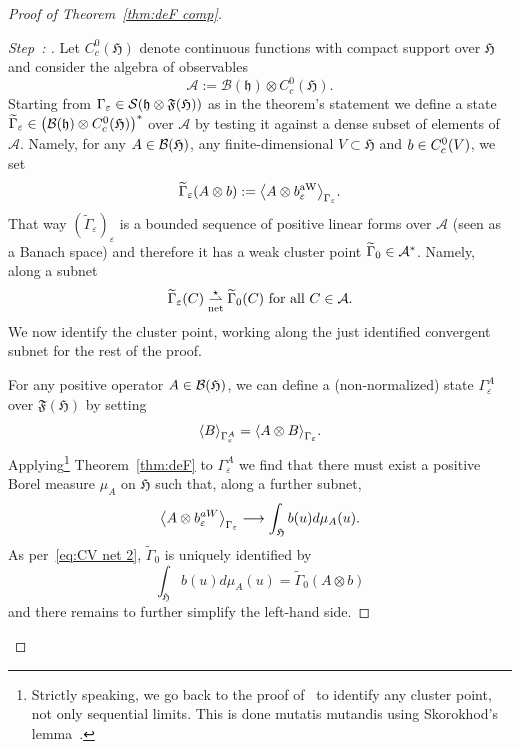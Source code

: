 \documentclass[10pt]{amsart}
\theoremstyle{definition}\newtheorem{defi}[theo]{Definition}\newtheorem{rema}[theo]{Remark}\newtheorem{exam}[theo]{Example}\newtheorem{exem}[theo]{Example}\newtheorem{nota}[theo]{Notation}
\newcommand{\cA}{\mathcal{A}}
\newcommand{\cS}{\mathcal{S}}
\newcommand{\gH}{\mathfrak{H}}
\newcommand{\gF}{\mathfrak{F}}
\newcommand{\gh}{\mathfrak{h}}
\newcommand{\cB}{\mathcal{B}}
\newcommand{\1}{\mathds{1}}
\newcommand{\eps}{\varepsilon}
\newcommand{\Gammat}{\widetilde{\Gamma}}
\newcommand{\cvnet}{\overset{\star}{\underset{\mathrm{net}}{\rightharpoonup}}}
\let\oldin\in
\renewcommand{\in}{\mathchoice{\oldin}{\oldin}{\,\oldin\,}{\,\oldin\,}}
\renewcommand*{\to}{\mathchoice{\longrightarrow}{\rightarrow}{\rightarrow}{\rightarrow}}
\newcounter{setofstep}
\newcounter{step}[setofstep]
\newenvironment{step}[1][]{\refstepcounter{step}\begin{proof}[{Step~\thestep\if#1\empty\else: #1\fi}]}{\let\qed\relax\end{proof}}
\let\originalleft\left
\let\originalright\right
\renewcommand{\left}{\mathopen{}\mathclose\bgroup\originalleft}
\renewcommand{\right}{\aftergroup\egroup\originalright}
\newenvironment{proofc}[1][\proofname]{\begin{proof}[#1]}{\end{proof}}
\begin{document}
\begin{proofc}[Proof of Theorem~\ref{thm:deF comp}]
\begin{step}
Let $C^0_c (\gH)$ denote continuous functions with compact support over $\gH$ and consider the algebra of observables
\begin{equation*}
\cA := \cB (\gh) \otimes C^0_c (\gH).
\end{equation*}
Starting from $\Gamma_\eps \in \cS (\gh \otimes \gF (\gH))$ as in the theorem's statement we define a state $\Gammat_\eps\in \left(\cB (\gh) \otimes C^0_c (\gH) \right)^*$ over $\cA$ by testing it against a dense subset of elements of $\cA$. Namely, for any $A \in \cB(\gH)$, any finite-dimensional $V\subset \gH$ and $b\in C^0_c (V)$, we set
\begin{equation*}
\Gammat_\eps (A \otimes b) := \left\langle A \otimes b^{\rm aW}_{\eps} \right\rangle_{\Gamma_\eps}.
\end{equation*}
That way $(\Gammat_\eps)_\eps$ is a bounded sequence of positive linear forms over $\cA$ (seen as a Banach space) and therefore it has a weak cluster point $\Gammat_0 \in \cA ^*$. Namely, along a subnet
\begin{equation}\label{eq:CV net 2}
\Gammat_\eps (C) \cvnet \Gammat_0 (C) \text{ for all } C \in \cA.
\end{equation}
We now identify the cluster point, working along the just identified convergent subnet for the rest of the proof.

For any positive operator $A\in \cB (\gH)$, we can define a (non-normalized) state $\Gamma ^A _\eps$ over $\gF (\gH)$ by setting
\begin{equation*}
\left\langle B \right\rangle_{\Gamma^A_\eps} = \left\langle A \otimes B\right\rangle_{\Gamma_\eps}.
\end{equation*}
Applying\footnote{Strictly speaking, we go back to the proof of~\cite[Item (i)]{LewNamRou-14d} to identify any cluster point, not only sequential limits. This is done mutatis mutandis using Skorokhod's lemma~\cite{Skorokhod-74}.} Theorem~\ref{thm:deF} to $\Gamma ^A _\eps$ we find that there must exist a positive Borel measure $\mu_A$ on $\gH$ such that, along a further subnet,
\begin{equation}\label{eq:CV net 3}
\left\langle A \otimes b_{\eps}^{aW}\right\rangle _{\Gamma_\eps} \to \int_ \gH b(u) d\mu_A (u).
\end{equation}
As per~\eqref{eq:CV net 2}, $\Gammat_0$ is uniquely identified by
\[
\int_ \gH b(u) d\mu_A (u) = \Gammat_0 (A\otimes b)
\]
and there remains to further simplify the left-hand side.


\end{step}
\end{proofc}
\end{document}
